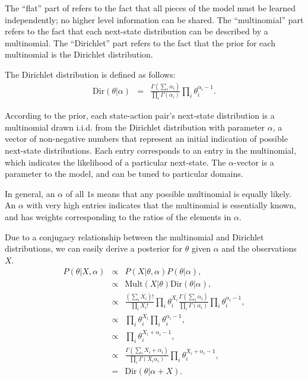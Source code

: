 The ``flat'' part of  refers to the fact that all pieces of the model must be learned independently; no higher level information can be shared. The ``multinomial'' part refers to the fact that each next-state distribution can be described by a multinomial. The ``Dirichlet'' part refers to the fact that the prior for each multinomial is the Dirichlet distribution.

The Dirichlet distribution is defined as follows:
\begin{eqnarray}
\mbox{Dir}(\theta|\alpha) &=& \frac{\Gamma\left(\sum_i \alpha_i\right)}{\prod_i \Gamma(\alpha_i)} \prod_i \theta_i^{\alpha_i-1}.
\end{eqnarray}

According to the  prior, each state-action pair's next-state distribution is a multinomial drawn i.i.d. from the Dirichlet distribution with parameter $\alpha$, a vector of non-negative numbers that represent an initial indication of possible next-state distributions. Each entry corresponds to an entry in the multinomial, which indicates the likelihood of a particular next-state. The $\alpha$-vector is a parameter to the model, and can be tuned to particular domains.

In general, an $\alpha$ of all $1$s means that any possible multinomial is equally likely. An $\alpha$ with very high entries indicates that the multinomial is essentially known, and has weights corresponding to the ratios of the elements in $\alpha$.

Due to a conjugacy relationship between the multinomial and Dirichlet distributions, we can easily derive a posterior for $\theta$ given $\alpha$ and the observations $X$.
\begin{eqnarray}
P(\theta|X,\alpha) &\propto& P(X|\theta,\alpha) P(\theta|\alpha),\\
&\propto& \mbox{Mult}(X|\theta) \mbox{Dir}(\theta|\alpha),\\
&\propto& \frac{\left(\sum_i X_i\right)!}{\prod_i X_i!} \prod_i \theta_i^{X_i} \frac{\Gamma\left(\sum_i \alpha_i\right)}{\prod_i \Gamma(\alpha_i)} \prod_i \theta_i^{\alpha_i-1},\\
&\propto& \prod_i \theta_i^{X_i} \prod_i \theta_i^{\alpha_i-1},\\
&\propto& \prod_i \theta_i^{X_i+\alpha_i-1},\\
&\propto& \frac{\Gamma\left(\sum_i X_i+\alpha_i\right)}{\prod_i \Gamma(X_i\alpha_i)} \prod_i \theta_i^{X_i+\alpha_i-1},\\
&=& \mbox{Dir}(\theta|\alpha+X).
\end{eqnarray}

